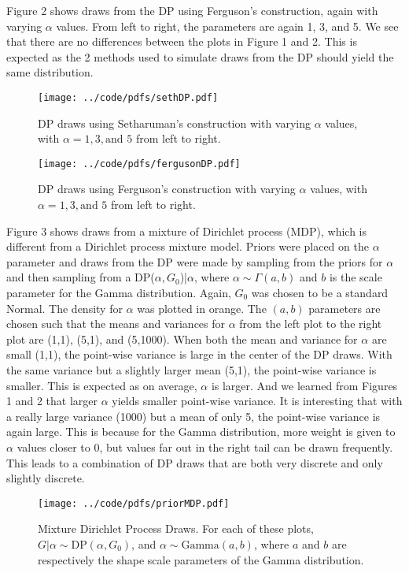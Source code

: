 \documentclass{article}
\def\beginmyfig{\begin{figure}[htbp]\begin{center}}
\def\endmyfig{\end{center}\end{figure}}
\begin{document}
\noindent
Figure 2 shows draws from the DP using Ferguson's construction, again with
varying $\alpha$ values.  From left to right, the parameters are again 1, 3,
and 5. We see that there are no differences between the plots in Figure 1 and
2. This is expected as the 2 methods used to simulate draws from the DP should
yield the same distribution.

\vspace{5em}
\beginmyfig
  \texttt{[image: ../code/pdfs/sethDP.pdf]}
  \caption{DP draws using Setharuman's construction with varying $\alpha$
  values, with $\alpha=1, 3, \text{and } 5$ from left to right.}
\endmyfig
\beginmyfig
  \texttt{[image: ../code/pdfs/fergusonDP.pdf]}
  \caption{DP draws using Ferguson's construction with varying $\alpha$
  values, with $\alpha=1, 3, \text{and } 5$ from left to right.}
\endmyfig

\noindent
Figure 3 shows draws from a mixture of Dirichlet process (MDP), which is
different from a Dirichlet process mixture model. Priors were placed on the
$\alpha$ parameter and draws from the DP were made by sampling from the priors
for $\alpha$ and then sampling from a DP($\alpha,G_0$)|$\alpha$, where $\alpha
\sim \Gamma(a,b)$ and $b$ is the scale parameter for the Gamma distribution.
Again, $G_0$ was chosen to be a standard Normal. The density for $\alpha$ was
plotted in orange. The $(a,b)$ parameters are chosen such that the means and
variances for $\alpha$ from the left plot to the right plot are (1,1), (5,1),
and (5,1000). When both the mean and variance for $\alpha$ are small (1,1), the
point-wise variance is large in the center of the DP draws. With the same
variance but a slightly larger mean (5,1), the point-wise variance is smaller.
This is expected as on average, $\alpha$ is larger. And we learned from Figures
1 and 2 that larger $\alpha$ yields smaller point-wise variance. It is
interesting that with a really large variance (1000) but a mean of only 5, the
point-wise variance is again large. This is because for the Gamma distribution,
more weight is given to $\alpha$ values closer to 0, but values far out in the
right tail can be drawn frequently. This leads to a combination of DP draws that
are both very discrete and only slightly discrete.
\beginmyfig
  \texttt{[image: ../code/pdfs/priorMDP.pdf]}
  \caption{Mixture Dirichlet Process Draws. For each of these plots, 
  $G|\alpha \sim \text{DP}(\alpha,G_0)$, and $\alpha \sim \text{Gamma}(a,b)$,
  where $a$ and $b$ are respectively the shape scale parameters of the 
  Gamma distribution.}
\endmyfig
\end{document}
